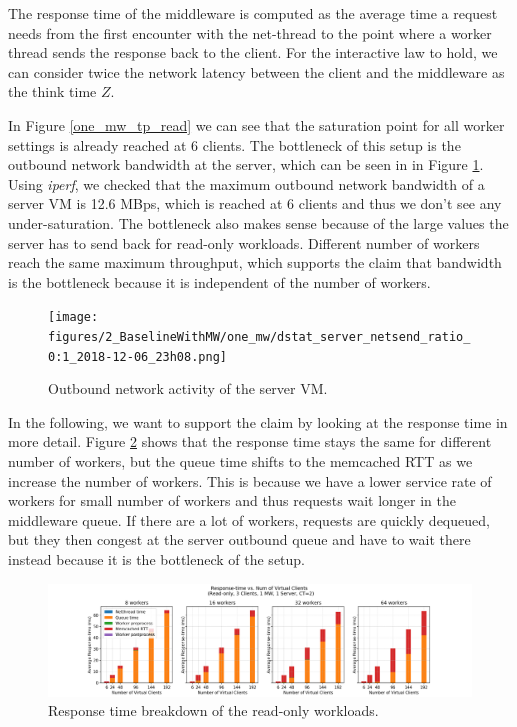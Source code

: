 The response time of the middleware is computed as the average time a request needs from the first encounter with the net-thread to the point where a worker thread sends the response back to the client. For the interactive law to hold, we can consider twice the network latency between the client and the middleware as the think time $Z$. 

In Figure \ref{one_mw_tp_read} we can see that the saturation point for all worker settings is already reached at $6$ clients. The bottleneck of this setup is the outbound network bandwidth at the server, which can be seen in in Figure \ref{outbound_server_net_activity_one_mws}. Using \textit{iperf}, we checked that the maximum outbound network bandwidth of a server VM is 12.6 MBps, which is reached at $6$ clients and thus we don't see any under-saturation. The bottleneck also makes sense because of the large values the server has to send back for read-only workloads. Different number of workers reach the same maximum throughput, which supports the claim that bandwidth is the bottleneck because it is independent of the number of workers. 
\begin{figure}[H]
    \centering
	\texttt{[image: figures/2\_BaselineWithMW/one\_mw/dstat\_server\_netsend\_ratio\_0:1\_2018-12-06\_23h08.png]}
	\caption{Outbound network activity of the server VM.}
	\label{outbound_server_net_activity_one_mws}
\end{figure}
In the following, we want to support the claim by looking at the response time in more detail. Figure \ref{rt_breakdown_read_one_mw} shows that the response time stays the same for different number of workers, but the queue time shifts to the memcached RTT as we increase the number of workers. This is because we have a lower service rate of workers for small number of workers and thus requests wait longer in the middleware queue. If there are a lot of workers, requests are quickly dequeued, but they then congest at the server outbound queue and have to wait there instead because it is the bottleneck of the setup. 

\begin{figure}[H]
    \centering
	\includegraphics[scale=0.48,width=\linewidth]{figures/2_BaselineWithMW/one_mw/one_mw_rt_breakdown_read_2018-12-06_23h08.png}
	\caption{Response time breakdown of the read-only workloads.}
	\label{rt_breakdown_read_one_mw}
\end{figure}

